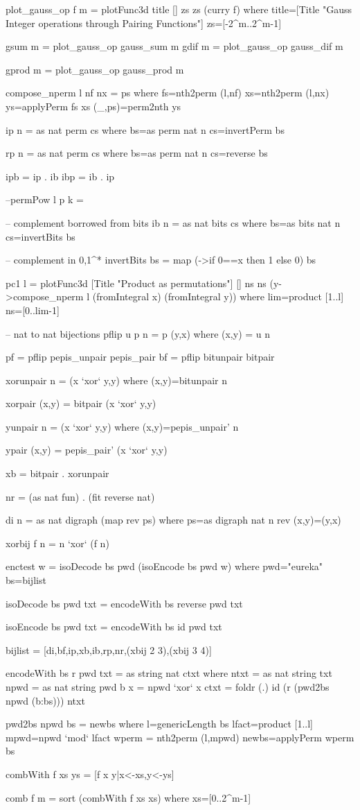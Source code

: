 \documentclass[]{INCLUDES/llncs}
\begin{document}
\begin{code}
plot_gauss_op f m = plotFunc3d title [] zs zs (curry f) where
  title=[Title "Gauss Integer operations through Pairing Functions"]
  zs=[-2^m..2^m-1]

gsum m = plot_gauss_op gauss_sum m
gdif m = plot_gauss_op gauss_dif m

gprod m = plot_gauss_op gauss_prod m

compose_nperm l nf nx = ps where
   fs=nth2perm (l,nf)
   xs=nth2perm (l,nx)
   ys=applyPerm fs xs
   (_,ps)=perm2nth ys

ip n = as nat perm cs where
  bs=as perm nat n
  cs=invertPerm bs

rp n = as nat perm cs where
  bs=as perm nat n
  cs=reverse bs
 
ipb = ip . ib
ibp = ib . ip
  
--permPow l p k = 

-- complement borrowed from bits
ib n = as nat bits cs where
  bs=as bits nat n
  cs=invertBits bs

-- complement in {0,1}^*  
invertBits bs = map (\x->if 0==x then 1 else 0) bs
  
pc1 l = plotFunc3d [Title "Product as permutations"] 
  [] ns ns (\x y->compose_nperm l (fromIntegral x) (fromIntegral y)) where 
    lim=product [1..l] 
    ns=[0..lim-1]


-- nat to nat bijections
pflip u p n = p (y,x) where (x,y) = u n
 
pf = pflip pepis_unpair pepis_pair
bf = pflip bitunpair bitpair
      
xorunpair n = (x `xor` y,y) where (x,y)=bitunpair n

xorpair (x,y) = bitpair (x `xor` y,y)

yunpair n = (x `xor` y,y) where (x,y)=pepis_unpair' n

ypair (x,y) = pepis_pair' (x `xor` y,y)

xb = bitpair . xorunpair

nr = (as nat fun) . (fit reverse nat)

di n = as nat digraph (map rev ps) where 
  ps=as digraph nat n
  rev (x,y)=(y,x)

xorbij f n = n `xor` (f n)

enctest w = isoDecode bs pwd (isoEncode bs pwd w) where 
  pwd="eureka"
  bs=bijlist

isoDecode bs pwd txt =  encodeWith bs reverse pwd txt

isoEncode bs pwd txt = encodeWith bs id pwd txt

bijlist = [di,bf,ip,xb,ib,rp,nr,(xbij 2 3),(xbij 3 4)]

encodeWith bs r pwd txt = as string nat ctxt where 
  ntxt = as nat string txt
  npwd = as nat string pwd
  b x = npwd `xor` x
  ctxt = foldr (.) id (r (pwd2bs npwd (b:bs))) ntxt

pwd2bs npwd bs = newbs where
  l=genericLength bs
  lfact=product [1..l]
  mpwd=npwd `mod` lfact
  wperm = nth2perm (l,mpwd)
  newbs=applyPerm wperm bs

combWith f xs ys = [f x y|x<-xs,y<-ys] 

comb f m = sort (combWith f xs xs) where xs=[0..2^m-1]

\end{code}
\end{document}
